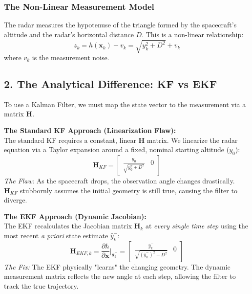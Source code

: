 \documentclass[11pt, letterpaper]{article}
\begin{document}
\subsubsection*{The Non-Linear Measurement Model}
The radar measures the hypotenuse of the triangle formed by the spacecraft's altitude and the radar's horizontal distance $D$. This is a non-linear relationship:
\begin{equation}
z_k = h(\mathbf{x}_k) + v_k = \sqrt{y_k^2 + D^2} + v_k
\end{equation}
where $v_k$ is the measurement noise.

\subsection*{2. The Analytical Difference: KF vs EKF}

To use a Kalman Filter, we must map the state vector to the measurement via a matrix $\mathbf{H}$. 

\vspace{0.5cm}
\noindent \textbf{The Standard KF Approach (Linearization Flaw):} \\
The standard KF requires a constant, linear $\mathbf{H}$ matrix. We linearize the radar equation via a Taylor expansion around a fixed, nominal starting altitude ($y_0$):
\begin{equation}
\mathbf{H}_{KF} = \begin{bmatrix} \frac{y_0}{\sqrt{y_0^2 + D^2}} & 0 \end{bmatrix}
\end{equation}
\textit{The Flaw:} As the spacecraft drops, the observation angle changes drastically. $\mathbf{H}_{KF}$ stubbornly assumes the initial geometry is still true, causing the filter to diverge.

\vspace{0.5cm}
\noindent \textbf{The EKF Approach (Dynamic Jacobian):} \\
The EKF recalculates the Jacobian matrix $\mathbf{H}_k$ at \textit{every single time step} using the most recent \textit{a priori} state estimate $\hat{y}_{k}^-$:
\begin{equation}
\mathbf{H}_{EKF, k} = \frac{\partial h}{\partial \mathbf{x}} \bigg|_{\hat{\mathbf{x}}_{k}^-} = \begin{bmatrix} \frac{\hat{y}_{k}^-}{\sqrt{(\hat{y}_{k}^-)^2 + D^2}} & 0 \end{bmatrix}
\end{equation}
\textit{The Fix:} The EKF physically "learns" the changing geometry. The dynamic measurement matrix reflects the new angle at each step, allowing the filter to track the true trajectory.
\end{document}
